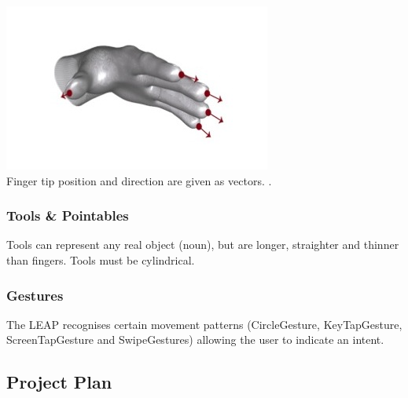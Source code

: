 \documentclass[a4paper, 10pt]{article}
\begin{document}
\begin{center}
\includegraphics[scale=0.4]{fingers}\\
Finger tip position and direction are given as vectors. \cite{leap}.
\end{center}


\subsubsection{Tools \& Pointables}
Tools can represent any real object (noun), but are longer, straighter and thinner than fingers. Tools must be cylindrical.

\subsubsection{Gestures}
The LEAP recognises certain movement patterns (CircleGesture, KeyTapGesture, ScreenTapGesture and SwipeGestures) allowing the user to indicate an intent.


\subsection{Project Plan}\label{plan}
\end{document}
